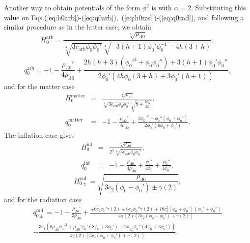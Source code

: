\documentclass[onecolumn,superscriptaddress,secnumarabic,amssymb,amsmath,nobibnotes,aps,prd,nofootinbib,altaffilletter]{revtex4}
\begin{document}
Another way to obtain potentials of the form $\phi^2$ is with $\alpha=2$. Substituting this value on Eqs.(\ref{eq:h0arb})-(\ref{eq:q0arb}),~(\ref{eq:h0rad})-(\ref{eq:q0rad}), and following a similar procedure as in the latter case, we obtain
\begin{equation}
    H_0^{\text{arb}} = \frac{\sqrt[4]{\rho_{\Lambda 0}}}{\sqrt[4]{3c_{\text{arb}}\phi_0\phi_0'}\sqrt[4]{-3(h+1)\phi_0'\phi_0^{-1} - 4h(3+h)}},
    \label{eq:h0arbalfa2}
\end{equation}
\begin{equation}
    q_0^{\text{arb}}=-1-\frac{\rho_{\Lambda 0}'}{4\rho_{\Lambda 0}} + \frac{2h(h+3)({\phi_0'}^2 + \phi_0 \phi_0'') + 3(h+1)\phi_0' \phi_0''}{2\phi_0'(4h\phi_0(3+h) + 3\phi_0'(h+1))},
    \label{q0arbalfa2}
\end{equation}
and for the matter case
\begin{eqnarray}
    H_0^{\text{matter}}&=&\frac{\sqrt[4]{\rho_{\Lambda 0}}}{\sqrt[4]{3c_{\text{arb}}\phi_0 \phi_0'}\sqrt[4]{9+\frac{3\phi_0'}{2\phi_0}}},
    \label{eq:h0matteralfa2}\\
    q_0^{\text{matter}}&=&-1-\frac{\rho_{\Lambda 0}'}{4\rho_{\Lambda 0}} + \frac{3{\phi_0'}^2 + \phi_0''(\phi_0+\phi_0')}{2\phi_0'(6\phi_0 + \phi_0')}.
    \label{eq:q0matteralfa2}
\end{eqnarray}
The inflation case gives
\begin{eqnarray}
    H_0^{\text{inf}}&=&\frac{\sqrt[4]{\rho_{\Lambda 0}}}{2^{\frac{3}{4}}\sqrt[4]{3c_{\text{arb}}\phi_0\phi_0'}},
    \label{eq:h0infalfa2}\\
    q_0^{\text{inf}}&=&-1-\frac{\rho_{\Lambda 0}'}{4\rho_{\Lambda 0}}+\frac{\phi_0'}{4\phi_0} + \frac{\phi_0''}{4\phi_0'},
    \label{eq:q0infalfa2}
\end{eqnarray}
\begin{equation}
    H_{0\pm}^{\text{rad}}=\sqrt{\frac{\rho_{\Lambda 0}}{3c_2(\phi_0+\phi_0')\pm \gamma(2)}},
    \label{eq:h0radalfa2}
\end{equation}
and for the radiation case
\begin{eqnarray}
    q_{0\pm}^{\text{rad}}=-1-\frac{\rho_{\Lambda 0}'}{2\rho_{\Lambda 0}} + \frac{\pm6c_2\phi_0' \gamma(2) \pm 6c_2\phi_0''\gamma(2) + 18c_2^2(\phi_0+\phi_0')(\phi_0'+  \phi_0'')}{4\gamma(2)(3c_2(\phi_0 + \phi_0') + \gamma(2))}\nonumber \\- \frac{3c_1(8\rho_{\Lambda 0}{\phi_0'}^2 + \rho_{\Lambda 0}'\phi_0'(8\phi_0 + 3\phi_0') + 2\rho_{\Lambda 0}\phi_0''(4\phi_0 + 3\phi_0'))}{4\gamma(2)(3c_2(\phi_0 + \phi_0') + \gamma(2))}.
    \label{eq:q0radalfa2}
\end{eqnarray}
\end{document}
